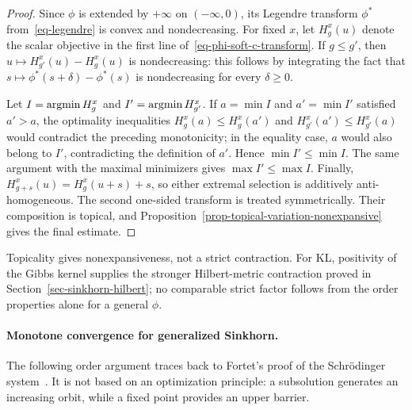 \begin{proof}
	Since $\phi$ is extended by $+\infty$ on $(-\infty,0)$, its Legendre transform $\phi^*$ from~\eqref{eq-legendre} is convex and nondecreasing. For fixed $x$, let $H_g^x(u)$ denote the scalar objective in the first line of~\eqref{eq-phi-soft-c-transform}. If $g\leq g'$, then $u\mapsto H_{g'}^x(u)-H_g^x(u)$ is nondecreasing: this follows by integrating the fact that $s\mapsto\phi^*(s+\delta)-\phi^*(s)$ is nondecreasing for every $\delta\geq0$.

	Let $I=\operatorname{argmin} H_g^x$ and $I'=\operatorname{argmin} H_{g'}^x$. If $a=\min I$ and $a'=\min I'$ satisfied $a'>a$, the optimality inequalities $H_g^x(a)\leq H_g^x(a')$ and $H_{g'}^x(a')\leq H_{g'}^x(a)$ would contradict the preceding monotonicity; in the equality case, $a$ would also belong to $I'$, contradicting the definition of $a'$. Hence $\min I'\leq\min I$. The same argument with the maximal minimizers gives $\max I'\leq\max I$. Finally, $H_{g+s}^x(u)=H_g^x(u+s)+s$, so either extremal selection is additively anti-homogeneous. The second one-sided transform is treated symmetrically. Their composition is topical, and Proposition~\ref{prop-topical-variation-nonexpansive} gives the final estimate.
\end{proof}

Topicality gives nonexpansiveness, not a strict contraction. For KL, positivity of the Gibbs kernel supplies the stronger Hilbert-metric contraction proved in Section~\ref{sec-sinkhorn-hilbert}; no comparable strict factor follows from the order properties alone for a general $\phi$.

\paragraph{Monotone convergence for generalized Sinkhorn.}
The following order argument traces back to Fortet's proof of the Schr\"odinger system~\cite{fortet1940schrodinger,essid2019fortet,leonard2019fortet}. It is not based on an optimization principle: a subsolution generates an increasing orbit, while a fixed point provides an upper barrier.

